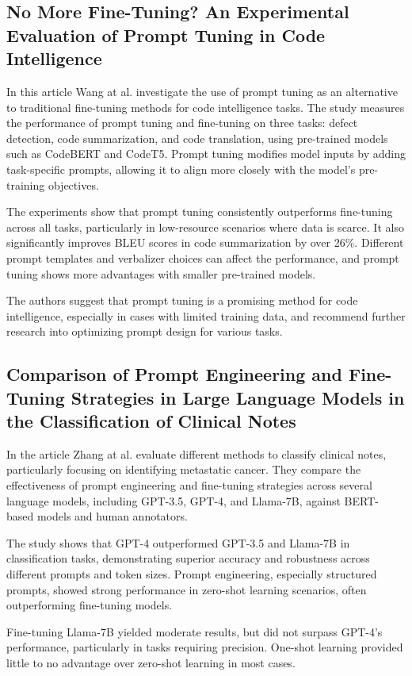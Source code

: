 \documentclass[11pt]{article}
\begin{document}
\subsection{No More Fine-Tuning? An Experimental Evaluation of Prompt
Tuning in Code Intelligence}

In this article Wang at al. investigate the use of prompt tuning as an alternative to traditional fine-tuning methods for code intelligence tasks. The study measures the performance of prompt tuning and fine-tuning on three tasks: defect detection, code summarization, and code translation, using pre-trained models such as CodeBERT and CodeT5. Prompt tuning modifies model inputs by adding task-specific prompts, allowing it to align more closely with the model’s pre-training objectives.

The experiments show that prompt tuning consistently outperforms fine-tuning across all tasks, particularly in low-resource scenarios where data is scarce. It also significantly improves BLEU scores in code summarization by over 26\%. Different prompt templates and verbalizer choices can affect the performance, and prompt tuning shows more advantages with smaller pre-trained models.

The authors suggest that prompt tuning is a promising method for code intelligence, especially in cases with limited training data, and recommend further research into optimizing prompt design for various tasks.

\subsection{Comparison of Prompt Engineering and Fine-Tuning Strategies in Large Language Models in the Classification of Clinical Notes}

In the article Zhang at al. evaluate different methods to classify clinical notes, particularly focusing on identifying metastatic cancer. They compare the effectiveness of prompt engineering and fine-tuning strategies across several language models, including GPT-3.5, GPT-4, and Llama-7B, against BERT-based models and human annotators.

The study shows that GPT-4 outperformed GPT-3.5 and Llama-7B in classification tasks, demonstrating superior accuracy and robustness across different prompts and token sizes. Prompt engineering, especially structured prompts, showed strong performance in zero-shot learning scenarios, often outperforming fine-tuning models.

Fine-tuning Llama-7B yielded moderate results, but did not surpass GPT-4’s performance, particularly in tasks requiring precision. One-shot learning provided little to no advantage over zero-shot learning in most cases.
\end{document}
